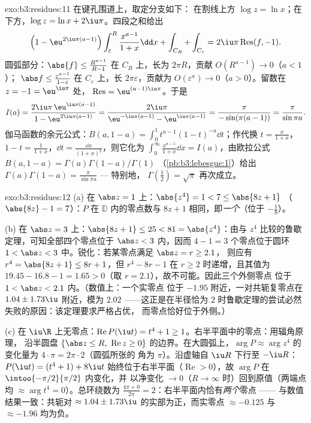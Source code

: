 \begin{solution}{exo:b3:residues:11}
在键孔围道上，取定分支如下：
在割线上方 $\log z = \ln x$；在下方，$\log z =
\ln x + 2\iu\pi$。四段之和给出
\[
\Bigl(1 - \eu^{2\iu\pi(a-1)}\Bigr)\int_\varepsilon^R
\frac{x^{a-1}}{1+x}\dd x + \int_{C_R} + \int_{C_\varepsilon}
= 2\iu\pi\operatorname{Res}(f, -1) .
\]
圆弧部分：$\abs{f} \leq \frac{R^{a-1}}{R - 1}$ 在 $C_R$ 上，长为
$2\pi R$，贡献 $O(R^{a-1}) \to 0$（$a < 1$）；
$\abs f \leq \frac{\varepsilon^{a-1}}{1 - \varepsilon}$ 在
$C_\varepsilon$ 上，长 $2\pi\varepsilon$，贡献为 $O(\varepsilon^a)
\to 0$（$a > 0$）。留数在 $z = -1 = \eu^{\iu\pi}$ 处，
$\operatorname{Res} = \eu^{(a-1)\iu\pi}$。于是
\[
I(a) = \frac{2\iu\pi\,\eu^{\iu\pi(a-1)}}{1 -
\eu^{2\iu\pi(a-1)}}
= \frac{2\iu\pi}{\eu^{-\iu\pi(a-1)} - \eu^{\iu\pi(a-1)}}
= \frac{\pi}{-\sin(\pi(a-1))} = \frac{\pi}{\sin\pi a} .
\]
伽马函数的余元公式：$B(a, 1-a) =
\int_0^1t^{a-1}(1-t)^{-a}\dd t$；作代换 $t =
\frac x{1+x}$，$1 - t = \frac1{1+x}$，$\dd t =
\frac{\dd x}{(1+x)^2}$，则它化为 $\int_0^\infty
\frac{x^{a-1}}{1+x}\dd x = I(a)$，由欧拉公式
$B(a, 1-a) = \Gamma(a)\Gamma(1-a)/\Gamma(1) $
（\cref{pb:b3:lebesgue:1}）给出
$\Gamma(a)\Gamma(1-a) = \frac\pi{\sin\pi a}$ --- 特别地，
$\Gamma(\tfrac12) = \sqrt\pi$ 再次成立。

\end{solution}

\begin{solution}{exo:b3:residues:12}
(a) 在 $\abs z = 1$ 上：$\abs{z^4} = 1 < 7 \leq \abs{8z + 1}$
（$\abs{8z} - 1 = 7$）：$P$ 在 $\mathbb D$ 内的零点数与
$8z + 1$ 相同，即\emph{一个}（位于 $-\frac18$）。

(b) 在 $\abs z = 3$ 上：$\abs{8z + 1} \leq 25 < 81 =
\abs{z^4}$：由与 $z^4$ 比较的鲁歇定理，可知全部四个零点位于
$\abs z < 3$ 内，因而 $4 - 1 = 3$ 个零点位于圆环 $1 <
\abs z < 3$ 中。锐化：若某零点满足 $\abs z = r \geq 2.1$，
则应有 $r^4 = \abs{8z + 1} \leq 8r + 1$，但 $r^4 -
8r - 1$ 在 $r \geq 2$ 时递增，且其值为 $19.45 -
16.8 - 1 = 1.65 > 0$（取 $r = 2.1$），故不可能。因此三个外侧零点
位于 $1 < \abs z < 2.1$ 内。（数值上：一个实零点
位于 $-1.95$ 附近，一对共轭复零点在 $1.04 \pm
1.73\iu$ 附近，模为 $2.02$ ——这正是在半径恰为
$2$ 时鲁歇定理的尝试必然失败的原因：该定理要求严格占优，
而零点恰好位于外侧。）

(c) 在 $\iu\R$ 上无零点：$\operatorname{Re}P(\iu t) = t^4 +
1 \geq 1$。右半平面中的零点：用辐角原理，
沿半圆盘 $\{\abs z \leq
R,\ \operatorname{Re}z \geq 0\}$ 的边界。在大圆弧上，$\arg P
\approx \arg z^4$ 的变化量为 $4\cdot\pi = 2\pi\cdot2$（圆弧所张的
角为 $\pi$）。沿虚轴自
$\iu R$ 下行至 $-\iu R$：$P(\iu t) = (t^4 + 1) + 8\iu t$
始终位于右半平面（$\operatorname{Re} > 0$），故
$\arg P$ 在 $\intoo{-\pi/2}{\pi/2}$ 内变化，并
以净变化 $\to 0$（$R \to \infty$ 时）回到原值（两端点均
$\approx \arg t^4 = 0$）。总环绕数为 $\frac{4\pi + 0}
{2\pi} = 2$：右半平面内恰有\emph{两个}零点 ——
与数值结果一致：共轭对 $\approx
1.04 \pm 1.73\iu$ 的实部为正，而实零点
$\approx -0.125$ 与 $\approx -1.96$ 均为负。
\end{solution}

